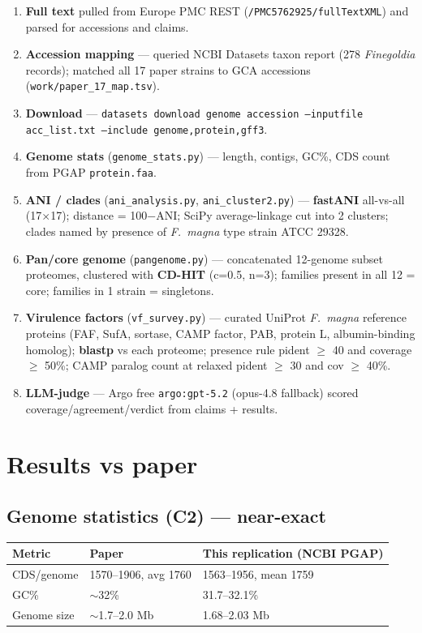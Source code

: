 \documentclass[11pt]{article}
\begin{document}
\begin{enumerate}
\item \textbf{Full text} pulled from Europe PMC REST (\texttt{/PMC5762925/fullTextXML}) and parsed for accessions and claims.
\item \textbf{Accession mapping} --- queried NCBI Datasets taxon report (278 \emph{Finegoldia} records); matched all 17 paper strains to GCA accessions (\texttt{work/paper\_17\_map.tsv}).
\item \textbf{Download} --- \texttt{datasets download genome accession --inputfile acc\_list.txt --include genome,protein,gff3}.
\item \textbf{Genome stats} (\texttt{genome\_stats.py}) --- length, contigs, GC\%, CDS count from PGAP \texttt{protein.faa}.
\item \textbf{ANI / clades} (\texttt{ani\_analysis.py}, \texttt{ani\_cluster2.py}) --- \textbf{fastANI} all-vs-all (17$\times$17); distance = 100$-$ANI; SciPy average-linkage cut into 2 clusters; clades named by presence of \emph{F.\ magna} type strain ATCC 29328.
\item \textbf{Pan/core genome} (\texttt{pangenome.py}) --- concatenated 12-genome subset proteomes, clustered with \textbf{CD-HIT} (c=0.5, n=3); families present in all 12 = core; families in 1 strain = singletons.
\item \textbf{Virulence factors} (\texttt{vf\_survey.py}) --- curated UniProt \emph{F.\ magna} reference proteins (FAF, SufA, sortase, CAMP factor, PAB, protein L, albumin-binding homolog); \textbf{blastp} vs each proteome; presence rule pident $\geq$ 40 and coverage $\geq$ 50\%; CAMP paralog count at relaxed pident $\geq$ 30 and cov $\geq$ 40\%.
\item \textbf{LLM-judge} --- Argo free \texttt{argo:gpt-5.2} (opus-4.8 fallback) scored coverage/agreement/verdict from claims + results.
\end{enumerate}

\section{Results vs paper}

\subsection{Genome statistics (C2) --- near-exact}
\begin{tabular}{lll}
\toprule
Metric & Paper & This replication (NCBI PGAP) \\
\midrule
CDS/genome & 1570--1906, avg 1760 & 1563--1956, mean 1759 \\
GC\%       & $\sim$32\%           & 31.7--32.1\% \\
Genome size & $\sim$1.7--2.0 Mb   & 1.68--2.03 Mb \\
\bottomrule
\end{tabular}
\end{document}
